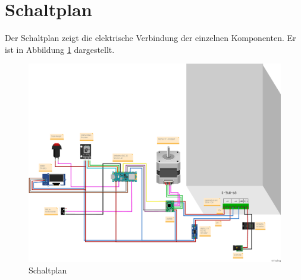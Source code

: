\section{Schaltplan}
Der Schaltplan zeigt die elektrische Verbindung der einzelnen Komponenten. Er ist in Abbildung \ref{Splan} dargestellt.

\begin{figure}[H]
	\begin{center}
		\includegraphics[width=\textwidth]{Images/Schaltplan1.png}
		\caption{Schaltplan} \label{Splan}
	\end{center}
\end{figure}

 
